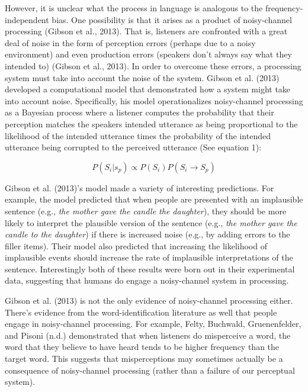 \documentclass[
  jou,floatsintext]{apa6}
\begin{document}
However, it is unclear what the process in language is analogous to the frequency-independent bias. One possibility is that it arises as a product of noisy-channel processing (Gibson et al., 2013). That is, listeners are confronted with a great deal of noise in the form of perception errors (perhaps due to a noisy environment) and even production errors (speakers don't always say what they intended to) (Gibson et al., 2013). In order to overcome these errors, a processing system must take into account the noise of the system. Gibson et al. (2013) developed a computational model that demonstrated how a system might take into account noise. Specifically, his model operationalizes noisy-channel processing as a Bayesian process where a listener computes the probability that their perception matches the speakers intended utterance as being proportional to the likelihood of the intended utterance times the probability of the intended utterance being corrupted to the perceived utterance (See equation 1):

\begin{equation}
\label{eq:gibsonnoisy}
P(S_i|s_p) \propto P(S_i) P(S_i \to S_p)
\end{equation}

Gibson et al. (2013)'s model made a variety of interesting predictions. For example, the model predicted that when people are presented with an implausible sentence (e.g., \emph{the mother gave the candle the daughter}), they should be more likely to interpret the plausible version of the sentence (e.g., \emph{the mother gave the candle to the daughter}) if there is increased noise (e.g., by adding errors to the filler items). Their model also predicted that increasing the likelihood of implausible events should increase the rate of implausible interpretations of the sentence. Interestingly both of these results were born out in their experimental data, suggesting that humans do engage a noisy-channel system in processing.

Gibson et al. (2013) is not the only evidence of noisy-channel processing either. There's evidence from the word-identification literature as well that people engage in noisy-channel processing. For example, Felty, Buchwald, Gruenenfelder, and Pisoni (n.d.) demonstrated that when listeners do misperceive a word, the word that they believe to have heard tends to be higher frequency than the target word. This suggests that misperceptions may sometimes actually be a consequence of noisy-channel processing (rather than a failure of our perceptual system).
\end{document}
